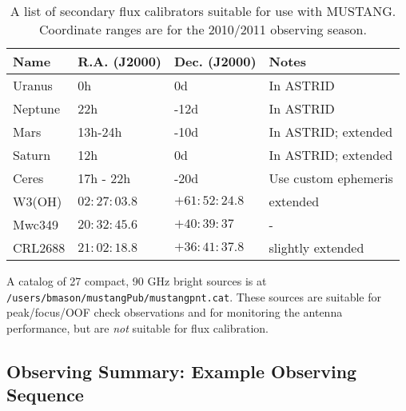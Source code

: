 \begin{table}
\begin{tabular}{|l|l|l|l|}
\hline
Name & R.A. (J2000) & Dec. (J2000) & Notes \\ \hline
Uranus & 0h & 0d & In ASTRID  \\
Neptune & 22h & -12d & In ASTRID \\
Mars & 13h-24h & -10d & In ASTRID; extended \\
Saturn & 12h & 0d & In ASTRID; extended \\
Ceres  & 17h - 22h & -20d & Use custom ephemeris\\
W3(OH) & $02:27:03.8$ & $+61:52:24.8$ & extended \\
Mwc349 & $20:32:45.6$ & $+40:39:37$ & -\\
CRL2688& $21:02:18.8$ & $+36:41:37.8$ & slightly extended \\ \hline
\end{tabular}
\caption[A list of secondary flux calibrators suitable for use with MUSTANG]
{A list of secondary flux calibrators suitable for use with MUSTANG.
Coordinate ranges are for the 2010/2011 observing season.}
\label{tbl:musfluxcals}
\end{table}

A catalog of 27 compact, 90 GHz bright sources is at {\tt
/users/bmason/mustangPub/mustangpnt.cat}. These sources are suitable for
peak/focus/OOF check observations and for monitoring the antenna
performance, but are {\it not} suitable for flux calibration.

\subsection{Observing Summary: Example Observing Sequence}

